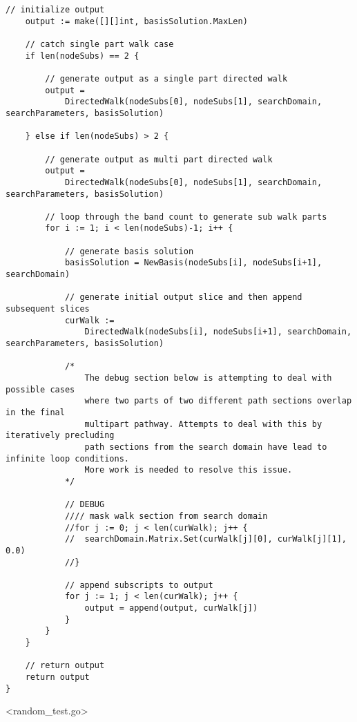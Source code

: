 \begin{lstlisting}[basicstyle=\tiny]
	// initialize output
	output := make([][]int, basisSolution.MaxLen)

	// catch single part walk case
	if len(nodeSubs) == 2 {

		// generate output as a single part directed walk
		output = 
		    DirectedWalk(nodeSubs[0], nodeSubs[1], searchDomain, searchParameters, basisSolution)

	} else if len(nodeSubs) > 2 {

		// generate output as multi part directed walk
		output = 
		    DirectedWalk(nodeSubs[0], nodeSubs[1], searchDomain, searchParameters, basisSolution)

		// loop through the band count to generate sub walk parts
		for i := 1; i < len(nodeSubs)-1; i++ {

			// generate basis solution
			basisSolution = NewBasis(nodeSubs[i], nodeSubs[i+1], searchDomain)

			// generate initial output slice and then append subsequent slices
			curWalk := 
			    DirectedWalk(nodeSubs[i], nodeSubs[i+1], searchDomain, searchParameters, basisSolution)

			/*
				The debug section below is attempting to deal with possible cases
				where two parts of two different path sections overlap in the final
				multipart pathway. Attempts to deal with this by iteratively precluding
				path sections from the search domain have lead to infinite loop conditions.
				More work is needed to resolve this issue.
			*/

			// DEBUG
			//// mask walk section from search domain
			//for j := 0; j < len(curWalk); j++ {
			//	searchDomain.Matrix.Set(curWalk[j][0], curWalk[j][1], 0.0)
			//}

			// append subscripts to output
			for j := 1; j < len(curWalk); j++ {
				output = append(output, curWalk[j])
			}
		}
	}

	// return output
	return output
}

\end{lstlisting}

\newpage

<random\_test.go>

